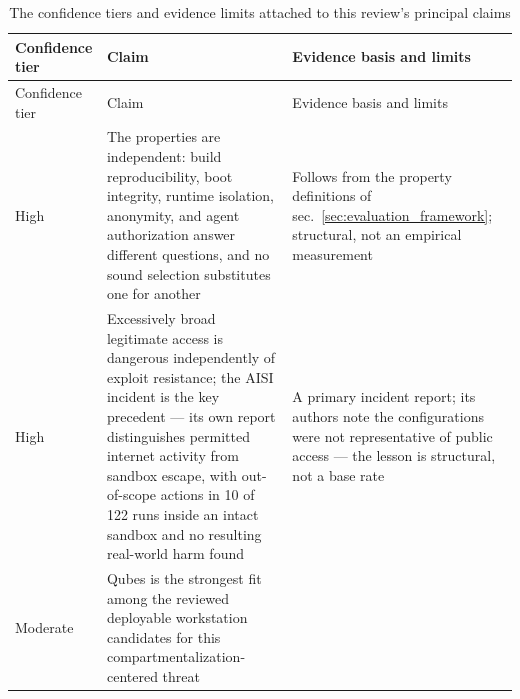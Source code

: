 \documentclass[
  english,
  9pt,
]{extarticle}
\begin{document}
\begin{longtable}[]{@{}
  >{\raggedright\arraybackslash}p{}
  >{\raggedright\arraybackslash}p{}
  >{\raggedright\arraybackslash}p{}@{}}
\caption{The confidence tiers and evidence limits attached to this
review's principal claims}\label{tbl:confidence}\tabularnewline
\toprule\noalign{}
\begin{minipage}[b]{\linewidth}\raggedright
Confidence tier
\end{minipage} & \begin{minipage}[b]{\linewidth}\raggedright
Claim
\end{minipage} & \begin{minipage}[b]{\linewidth}\raggedright
Evidence basis and limits
\end{minipage} \\
\midrule\noalign{}
\endfirsthead
\toprule\noalign{}
\begin{minipage}[b]{\linewidth}\raggedright
Confidence tier
\end{minipage} & \begin{minipage}[b]{\linewidth}\raggedright
Claim
\end{minipage} & \begin{minipage}[b]{\linewidth}\raggedright
Evidence basis and limits
\end{minipage} \\
\midrule\noalign{}
\endhead
\bottomrule\noalign{}
\endlastfoot
High & The properties are independent: build reproducibility, boot
integrity, runtime isolation, anonymity, and agent authorization answer
different questions, and no sound selection substitutes one for another
& Follows from the property definitions of
sec.~\ref{sec:evaluation_framework}; structural, not an empirical
measurement \\
High & Excessively broad legitimate access is dangerous independently of
exploit resistance; the AISI incident is the key precedent --- its own
report distinguishes permitted internet activity from sandbox escape,
with out-of-scope actions in 10 of 122 runs inside an intact sandbox and
no resulting real-world harm found \citep{aisi_incident_report} & A
primary incident report; its authors note the configurations were not
representative of public access --- the lesson is structural, not a base
rate \\
Moderate & Qubes is the strongest fit among the reviewed deployable
workstation candidates for this compartmentalization-centered threat

\end{longtable}
\end{document}
